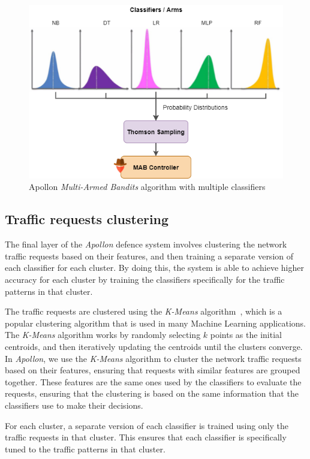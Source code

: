 \begin{figure}
    \centering
    \includegraphics[width=0.9\columnwidth]{ApollonMAB.png}
    \caption{Apollon \textit{Multi-Armed Bandits} algorithm with multiple classifiers}
    \label{fig:mab-algorithm}
\end{figure}


\subsection{Traffic requests clustering}\label{subsec:traffic-requests-clustering}
The final layer of the \textit{Apollon} defence system involves clustering the network traffic requests based on their
features, and then training a separate version of each classifier for each cluster.
By doing this, the system is able to achieve higher accuracy for each cluster by training the classifiers specifically
for the traffic patterns in that cluster.

The traffic requests are clustered using the \textit{K-Means} algorithm~\cite{sinaga2020unsupervised}, which is a
popular clustering algorithm that is used in many Machine Learning applications.
The \textit{K-Means} algorithm works by randomly selecting $k$ points as the initial centroids, and then iteratively
updating the centroids until the clusters converge.
In \textit{Apollon}, we use the \textit{K-Means} algorithm to cluster the network traffic requests based on their features,
ensuring that requests with similar features are grouped together.
These features are the same ones used by the classifiers to evaluate the requests, ensuring that the clustering is
based on the same information that the classifiers use to make their decisions.

For each cluster, a separate version of each classifier is trained using only the traffic requests in that cluster.
This ensures that each classifier is specifically tuned to the traffic patterns in that cluster.

